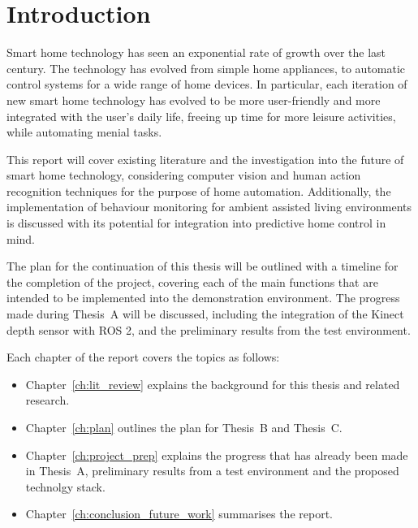 \chapter{Introduction}\label{ch:intro}

Smart home technology has seen an exponential rate of growth over the last century.
The technology has evolved from simple home appliances, to automatic control systems for a wide range of home devices.
In particular, each iteration of new smart home technology has evolved to be more user-friendly and more integrated with the user's daily life, freeing up time for more leisure activities, while automating menial tasks.

This report will cover existing literature and the investigation into the future of smart home technology, considering computer vision and human action recognition techniques for the purpose of home automation.
Additionally, the implementation of behaviour monitoring for ambient assisted living environments is discussed with its potential for integration into predictive home control in mind.

The plan for the continuation of this thesis will be outlined with a timeline for the completion of the project, covering each of the main functions that are intended to be implemented into the demonstration environment.
The progress made during Thesis~A will be discussed, including the integration of the Kinect depth sensor with ROS 2, and the preliminary results from the test environment.

\newpage

Each chapter of the report covers the topics as follows:
\begin{itemize}
    \item Chapter~\ref{ch:lit_review} explains the background for this thesis and related research.
    \item Chapter~\ref{ch:plan} outlines the plan for Thesis~B and Thesis~C.
    \item Chapter~\ref{ch:project_prep} explains the progress that has already been made in Thesis~A, preliminary results from a test environment and the proposed technolgy stack.
    \item Chapter~\ref{ch:conclusion_future_work} summarises the report.
\end{itemize}
